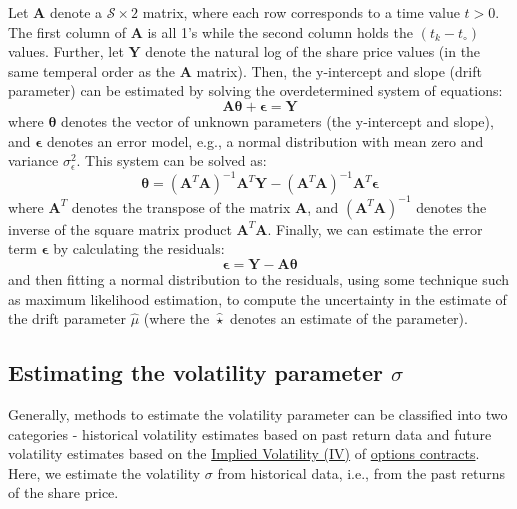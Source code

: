 \documentclass[11pt]{article}
\theoremstyle{definition}
\begin{document}
Let $\mathbf{A}$ denote a $\mathcal{S}\times{2}$ matrix, where each row corresponds to a time value $t>0$. 
The first column of $\mathbf{A}$ is all 1's while the second column holds the $(t_{k}-t_{\circ})$ values. 
Further, let $\mathbf{Y}$ denote the natural log of the share price values (in the same temperal order as the $\mathbf{A}$ matrix). 
Then, the y-intercept and slope (drift parameter) can be estimated by solving the overdetermined system of equations:
\begin{equation*}
\mathbf{A}\mathbf{\theta} + \mathbf{\epsilon} = \mathbf{Y}
\end{equation*}
where $\mathbf{\theta}$ denotes the vector of unknown parameters (the y-intercept and slope), and $\mathbf{\epsilon}$ denotes an error model, e.g., a normal distribution with mean zero and variance $\sigma_{\epsilon}^{2}$.
This system can be solved as:
\begin{equation*}
\mathbf{\theta} = (\mathbf{A}^{T}\mathbf{A})^{-1}\mathbf{A}^{T}\mathbf{Y} - (\mathbf{A}^{T}\mathbf{A})^{-1}\mathbf{A}^{T}\mathbf{\epsilon}
\end{equation*}
where $\mathbf{A}^{T}$ denotes the transpose of the matrix $\mathbf{A}$, and $(\mathbf{A}^{T}\mathbf{A})^{-1}$ denotes the inverse of the square matrix product $\mathbf{A}^{T}\mathbf{A}$. 
Finally, we can estimate the error term $\mathbf{\epsilon}$ by calculating the residuals:
\begin{equation*}
\mathbf{\epsilon} = \mathbf{Y} - \mathbf{A}\mathbf{\theta}
\end{equation*}
and then fitting a normal distribution to the residuals, using some technique such as maximum likelihood estimation, to compute the uncertainty in the estimate of the drift parameter $\hat{\mu}$ 
(where the $\hat{\star}$ denotes an estimate of the parameter).

\subsection*{Estimating the volatility parameter $\sigma$}
Generally, methods to estimate the volatility parameter can be classified into two categories - historical volatility estimates based on past return data and future volatility 
estimates based on the \href{https://en.wikipedia.org/wiki/Implied_volatility}{Implied Volatility (IV)} of \href{https://en.wikipedia.org/wiki/Option_(finance)}{options contracts}. 
Here, we estimate the volatility $\sigma$ from historical data, i.e., from the past returns of the share price.
\end{document}
